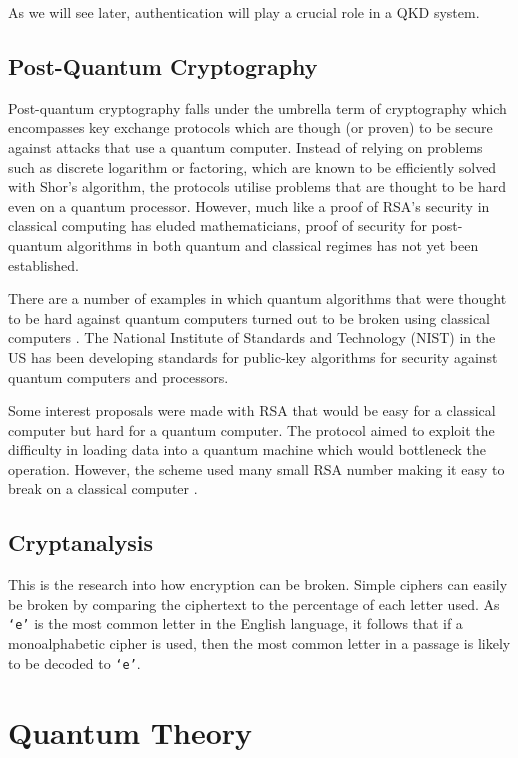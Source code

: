 As we will see later, authentication will play a crucial role in a \ac{QKD} system.

\subsection{Post-Quantum Cryptography}

Post-quantum cryptography falls under the umbrella term of  cryptography which encompasses key exchange protocols which are though (or proven) to be secure against attacks that use a quantum computer. Instead of relying on problems such as discrete logarithm or factoring, which are known to be efficiently solved with Shor's algorithm, the protocols utilise problems that are thought to be hard even on a quantum processor. However, much like a proof of RSA's security in classical computing has eluded mathematicians, proof of security for post-quantum algorithms in both quantum and classical regimes has not yet been established.

There are a number of examples in which quantum algorithms that were thought to be hard against quantum computers turned out to be broken using classical computers . The National Institute of Standards and Technology (NIST) in the US has been developing standards for public-key algorithms for security against quantum computers and processors.

Some interest proposals were made with RSA that would be easy for a classical computer but hard for a quantum computer. The protocol aimed to exploit the difficulty in loading data into a quantum machine which would bottleneck the operation. However, the scheme used many small RSA number making it easy to break on a classical computer .

\subsection{Cryptanalysis}
\label{sec1:cryptanalysis}

This is the research into how encryption can be broken. Simple ciphers can easily be broken by comparing the ciphertext to the percentage of each letter used. As \texttt{`e'} is the most common letter in the English language, it follows that if a monoalphabetic cipher is used, then the most common letter in a passage is likely to be decoded to \texttt{`e'}.

\section{Quantum Theory}

